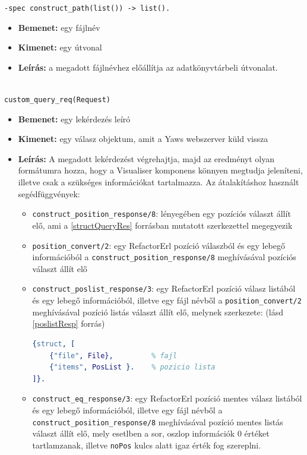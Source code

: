 \noindent \lstinline{-spec construct_path(list()) -> list().}
\begin{itemize}
    \item \textbf{Bemenet:} egy fájlnév
    \item \textbf{Kimenet:} egy útvonal
    \item \textbf{Leírás:} a megadott fájlnévhez előállítja az adatkönyvtárbeli útvonalat.
\end{itemize} \\


\noindent \lstinline{custom_query_req(Request)}
\begin{itemize}
    \item \textbf{Bemenet:} egy lekérdezés leíró
    \item \textbf{Kimenet:} egy válasz objektum, amit a Yaws webszerver küld vissza
    \item \textbf{Leírás:} A megadott lekérdezést végrehajtja, majd az eredményt olyan formátumra hozza, hogy a Visualiser komponens könnyen megtudja jeleníteni, illetve csak a szükséges információkat tartalmazza. Az átalakításhoz használt segédfüggvények:
    \begin{itemize}
        \item \lstinline{construct_position_response/8}: lényegében egy pozíciós választ állít elő, ami a \ref{structQueryRes} forrásban mutatott szerkezettel megegyezik
        
        \item \lstinline{position_convert/2}: egy RefactorErl pozíció válaszból és egy lebegő információból a \lstinline{construct_position_response/8} meghívásával pozíciós választ állít elő
        
        \item \lstinline{construct_poslist_response/3}: egy RefactorErl pozíció válasz listából és egy lebegő információból, illetve egy fájl névből a \lstinline{position_convert/2} meghívásával pozíció listás választ állít elő, melynek szerkezete: (lásd \ref{poslistResp} forrás)
        
\lstset{caption=Pozíció listás válasz, label=src:erlang} \label{poslistResp}
\begin{lstlisting}[language={erlang}]
 {struct, [
    {"file", File},         % fajl
    {"items", PosList }.    % pozicio lista
]}.
\end{lstlisting}

    \item \lstinline{construct_eq_response/3}: egy RefactorErl pozíció mentes válasz listából és egy lebegő információból, illetve egy fájl névből a \lstinline{construct_position_response/8} meghívásával pozíció mentes listás választ állít elő, mely esetlben a sor, oszlop információk 0 értéket tartlamzanak, illetve \lstinline{noPos} kulcs alatt igaz érték fog szereplni.
        
        
\end{itemize} \\
    \end{itemize}
    
